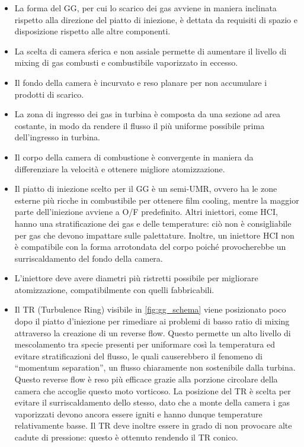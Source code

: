 \begin{itemize}[wide,itemsep=3pt,topsep=3pt]

\item
La forma del GG, per cui lo scarico dei gas avviene in maniera inclinata rispetto alla direzione del piatto di iniezione, è dettata da requisiti di spazio e disposizione rispetto alle altre componenti.

\item
La scelta di camera sferica e non assiale permette di aumentare il livello di mixing di gas combusti e combustibile vaporizzato in eccesso.

\item
Il fondo della camera è incurvato e reso planare per non accumulare i prodotti di scarico.

\item
La zona di ingresso dei gas in turbina è composta da una sezione ad area costante, in modo da rendere il flusso il più uniforme possibile prima dell'ingresso in turbina.

\item
Il corpo della camera di combustione è convergente in maniera da differenziare la velocità e ottenere migliore atomizzazione.

\item
Il piatto di iniezione scelto per il GG è un semi-UMR, ovvero ha le zone esterne più ricche in combustibile per ottenere film cooling, mentre la maggior parte dell’iniezione avviene a O/F predefinito.
Altri iniettori, come HCI, hanno una stratificazione dei gas e delle temperature: ciò non è consigliabile per gas che devono impattare sulle palettature. Inoltre, un iniettore HCI non è compatibile con la forma arrotondata del corpo poiché provocherebbe un surriscaldamento del fondo della camera.

\item
L’iniettore deve avere diametri più ristretti possibile per migliorare atomizzazione, compatibilmente con quelli fabbricabili.

\item
Il TR (Turbulence Ring) visibile in \autoref{fig:gg_schema} viene posizionato poco dopo il piatto d'iniezione per rimediare ai problemi di basso ratio di mixing attraverso la creazione di un reverse flow.
Questo permette un alto livello di mescolamento tra specie presenti per uniformare così la temperatura ed evitare stratificazioni del flusso, le quali causerebbero il fenomeno di “momentum separation”, un flusso chiaramente non sostenibile dalla turbina.
Questo reverse flow è reso più efficace grazie alla porzione circolare della camera che accoglie questo moto vorticoso.
La posizione del TR è scelta per evitare il surriscaldamento dello stesso, dato che a monte della camera i gas vaporizzati devono ancora essere igniti e hanno dunque temperature relativamente basse.
Il TR deve inoltre essere in grado di non provocare alte cadute di pressione: questo è ottenuto rendendo il TR conico.


\end{itemize}
